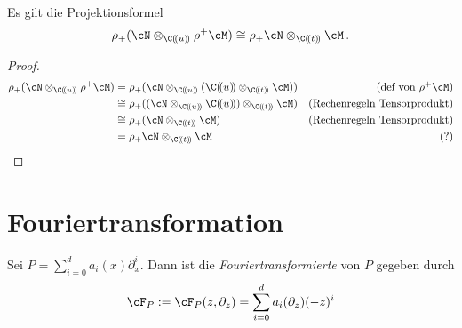 \begin{thm} \label{thm:Projektionsformel}
\cite[1.a]{sabbah_Fourier-local}
Es gilt die Projektionsformel
\begin{equation} \label{eq:Projektionsformel}
\rho_+(\cN\otimes_{\C(\!(u)\!)}\rho^+\cM) \cong
\rho_+\cN\otimes_{\C(\!(t)\!)}\cM\,.
\end{equation}
\end{thm}
\begin{proof}
\begin{align*}
\rho_+(\cN\otimes_{\C(\!(u)\!)}\rho^+\cM) &=
\rho_+(\cN\otimes_{\C(\!(u)\!)}(\C(\!(u)\!)\otimes_{\C(\!(t)\!)}\cM)) 
  & \mbox{(def von $\rho^+\cM$)}\\
&\cong \rho_+((\cN\otimes_{\C(\!(u)\!)}\C(\!(u)\!))
\otimes_{\C(\!(t)\!)}\cM) 
  & \mbox{(Rechenregeln Tensorprodukt)}\\ %
&\cong \rho_+(\cN\otimes_{\C(\!(t)\!)}\cM) 
  & \mbox{(Rechenregeln Tensorprodukt)}\\
&= \rho_+\cN\otimes_{\C(\!(t)\!)}\cM 
  & \mbox{(?)}
\end{align*}
\end{proof}

\begin{comment}
Sei $\rho(u)=u^p=t$ und $\phi(t)$ gegeben.
\begin{align*}
\rho^+\sE^{\phi(t)}&=\sE^{\phi(\rho(u))}=\sE^{\phi(u^p)}\\
\rho^+\rho_+\sE^{\phi(u)}
&=\underset{\zeta\in\mu_p}{\bigoplus}\sE^{\phi(\zeta\cdot u)}\\
\end{align*}
\end{comment}

\section{Fouriertransformation}

\begin{defn}[Fouriertransformation]
\cite[Def 6.1]{ZulaBarbara}
Sei $P=\sum_{i=0}^da_i(x)\partial_x^i$. Dann ist die
\emph{Fouriertransformierte} von
$P$ gegeben durch 
\[
\cF_P:=\cF_P(z,\partial_z)=\sum_{i=0}^da_i(\partial_z)(-z)^i
\]
\end{defn}

